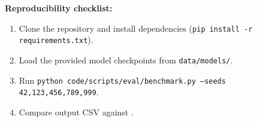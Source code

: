 \documentclass[preprint,12pt]{elsarticle}
\begin{document}
\noindent\textbf{Reproducibility checklist:}
\begin{enumerate}
  \item Clone the repository and install dependencies
        (\texttt{pip install -r requirements.txt}).
  \item Load the provided model checkpoints from \texttt{data/models/}.
  \item Run \texttt{python code/scripts/eval/benchmark.py --seeds 42,123,456,789,999}.
  \item Compare output CSV against .
\end{enumerate}
\end{document}
